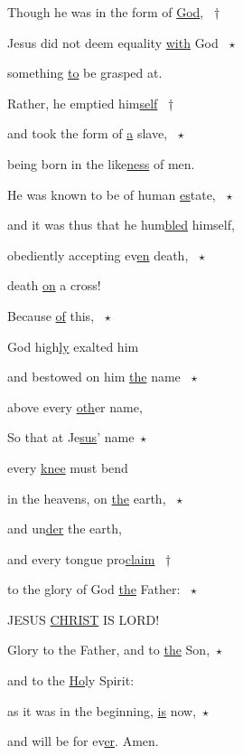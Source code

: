 \noindent Though he was in the form of \uline{God}, ~†~\nopagebreak

Jesus did not deem equality \uline{with} God ~$\star$~\nopagebreak

something \uline{to} be grasped at.

\noindent Rather, he emptied him\uline{self} ~†~\nopagebreak

and took the form of \uline{a} slave, ~$\star$~\nopagebreak

being born in the like\uline{ness} of men.

\noindent He was known to be of human \uline{es}tate, ~$\star$~\nopagebreak

and it was thus that he hum\uline{bled} himself,

\noindent obediently accepting ev\uline{en} death, ~$\star$~\nopagebreak

death \uline{on} a cross!

\noindent Because \uline{of} this, ~$\star$~\nopagebreak

God high\uline{ly} exalted him

\noindent and bestowed on him \uline{the} name ~$\star$~\nopagebreak

above every \uline{oth}er name,

\noindent So that at Je\uline{sus}’ name~$\star$~\nopagebreak

every \uline{knee} must bend

\noindent in the heavens, on \uline{the} earth, ~$\star$~\nopagebreak

and un\uline{der} the earth,

\noindent and every tongue pro\uline{claim} ~†~\nopagebreak

to the glory of God \uline{the} Father: ~$\star$~\nopagebreak

JESUS \uline{CHRIST} IS LORD!

\noindent Glory to the Father, and to \uline{the} Son,~$\star$~\nopagebreak

and to the \uline{Ho}ly Spirit:

\noindent as it was in the beginning, \uline{is} now,~$\star$~\nopagebreak

and will be for ev\uline{er}. Amen.